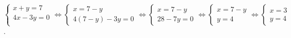 \begin{enumerate}
   $\begin{cases} x+y =7 \\ 4x-3y =0  \\ \end{cases}
   \iff \begin{cases} x =7-y \\ 4(7-y)-3y =0 \end{cases}
   \iff \begin{cases} x =7-y \\ 28-7y =0 \end{cases}
   \iff \begin{cases} x =7-y \\ y =4 \end{cases}
   \iff \begin{cases} x =3 \\ y =4 \end{cases}$. \\ [1mm]
\end{enumerate}
